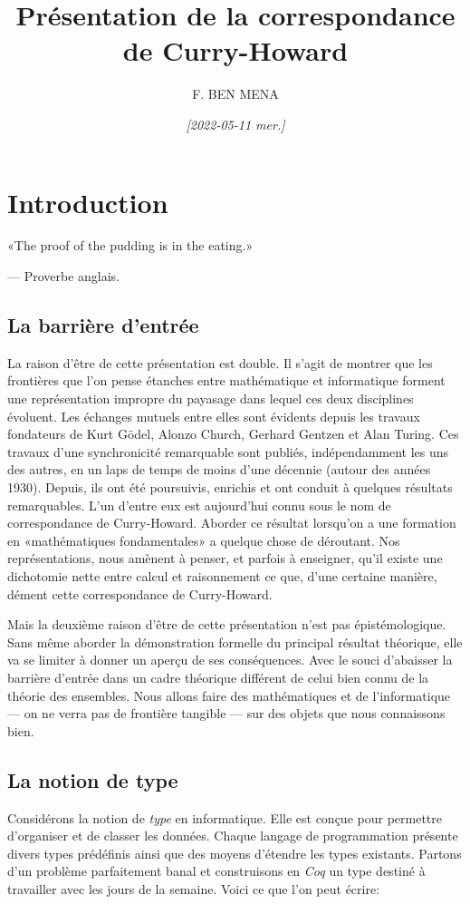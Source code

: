 \documentclass[a4paper,10pt]{article}
\author{F. BEN MENA}
\date{\textit{[2022-05-11 mer.]}}
\title{Présentation de la correspondance de Curry-Howard}
\begin{document}
\maketitle
\tableofcontents

\newpage


\section{Introduction}
\label{sec:org395ce7b}
\begin{flushright}
«The proof of the pudding is in the eating.»

--- Proverbe anglais.
\end{flushright}

\subsection{La barrière d'entrée}
\label{sec:org9b94410}
La raison d'être de cette présentation est double.  Il s'agit de montrer que les frontières que l'on pense
étanches entre mathématique et informatique forment une représentation impropre du payasage dans lequel ces
deux disciplines évoluent.  Les échanges mutuels entre elles sont évidents depuis les travaux fondateurs de
Kurt Gödel, Alonzo Church, Gerhard Gentzen et Alan Turing.  Ces travaux d'une synchronicité remarquable sont
publiés, indépendamment les uns des autres, en un laps de temps de moins d'une décennie (autour des années
1930).  Depuis, ils ont été poursuivis, enrichis et ont conduit à quelques résultats remarquables.  L'un
d'entre eux est aujourd'hui connu sous le nom de correspondance de Curry-Howard.  Aborder ce résultat
lorsqu'on a une formation en «mathématiques fondamentales» a quelque chose de déroutant.  Nos
représentations, nous amènent à penser, et parfois à enseigner, qu'il existe une dichotomie nette entre
calcul et raisonnement ce que, d'une certaine manière, dément cette correspondance de Curry-Howard.

Mais la deuxième raison d'être de cette présentation n'est pas épistémologique.  Sans même aborder la
démonstration formelle du principal résultat théorique, elle va se limiter à donner un aperçu de ses
conséquences.  Avec le souci d'abaisser la barrière d'entrée dans un cadre théorique différent de celui bien
connu de la théorie des ensembles.  Nous allons faire des mathématiques et de l'informatique --- on ne verra
pas de frontière tangible --- sur des objets que nous connaissons bien.

\subsection{La notion de type}
\label{sec:org2f77237}
Considérons la notion de \emph{type} en informatique.  Elle est conçue pour permettre d'organiser et de classer
les données.  Chaque langage de programmation présente divers types prédéfinis ainsi que des moyens
d'étendre les types existants.  Partons d'un problème parfaitement banal et construisons en \emph{Coq} un type
destiné à travailler avec les jours de la semaine.  Voici ce que l'on peut écrire:
\end{document}
